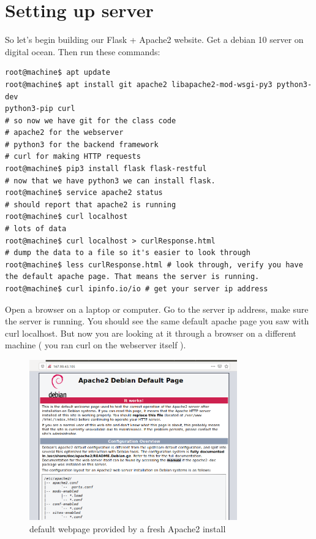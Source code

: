 \documentclass[10pt]{article}
\begin{document}
\section{Setting up server}
So let's begin building our Flask + Apache2 website. Get a debian 10 server on
digital ocean. Then run these commands:

\begin{lstlisting}[style=term]
root@machine$ apt update
root@machine$ apt install git apache2 libapache2-mod-wsgi-py3 python3-dev
python3-pip curl
# so now we have git for the class code
# apache2 for the webserver
# python3 for the backend framework
# curl for making HTTP requests
root@machine$ pip3 install flask flask-restful
# now that we have python3 we can install flask.
root@machine$ service apache2 status
# should report that apache2 is running
root@machine$ curl localhost
# lots of data
root@machine$ curl localhost > curlResponse.html
# dump the data to a file so it's easier to look through
root@machine$ less curlResponse.html # look through, verify you have the default apache page. That means the server is running.
root@machine$ curl ipinfo.io/io # get your server ip address
\end{lstlisting}

Open a browser on a laptop or computer. Go to the server ip address, make sure the server is running. You should see the same default apache page you saw with curl localhost. But now you are looking at it through a browser on a different machine ( you ran curl on the webserver itself ).

\begin{figure}[h]
  \centering
    \includegraphics[width=0.8\textwidth]{defaultApache.png}
  \caption{default webpage provided by a fresh Apache2 install}
\end{figure}
\end{document}
